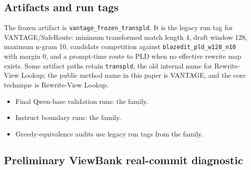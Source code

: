 \documentclass[11pt,a4paper]{article}
\begin{document}
\subsection{Artifacts and run tags}

The frozen artifact is \texttt{vantage\_frozen\_transpld}. It is the legacy
run tag for VANTAGE/SafeRoute: minimum transformed match length 4, draft window
128, maximum n-gram 10, candidate competition against
\texttt{blazedit\_pld\_w128\_n10} with margin 0, and a prompt-time route to PLD
when no effective rewrite map exists. Some artifact paths retain
\texttt{transpld}, the old internal name for Rewrite-View Lookup; the public
method name in this paper is VANTAGE, and the core technique is Rewrite-View
Lookup.

\begin{itemize}
\item Final Qwen-base validation runs: the
   family.
\item Instruct boundary runs: the
   family.
\item Greedy-equivalence audits use legacy run tags from the
   family.
\end{itemize}

\subsection{Preliminary ViewBank real-commit diagnostic}
\end{document}
